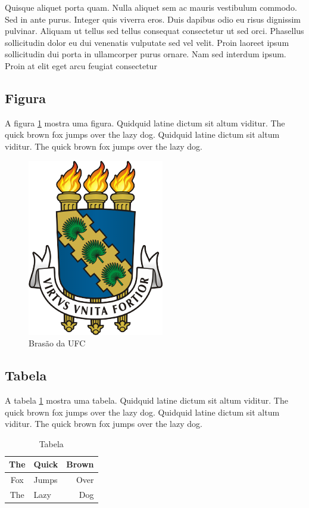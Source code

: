 Quisque aliquet porta quam. Nulla aliquet sem ac mauris vestibulum commodo. Sed in ante purus. Integer quis viverra eros. Duis dapibus odio eu risus dignissim pulvinar. Aliquam ut tellus sed tellus consequat consectetur ut sed orci. Phasellus sollicitudin dolor eu dui venenatis vulputate sed vel velit. Proin laoreet ipsum sollicitudin dui porta in ullamcorper purus ornare. Nam sed interdum ipsum. Proin at elit eget arcu feugiat consectetur 

\subsection{Figura}

A figura \ref{fig:graph} mostra uma figura. Quidquid latine dictum sit altum
viditur. The quick brown fox jumps over the lazy dog. Quidquid latine dictum
sit altum viditur. The quick brown fox jumps over the lazy dog.

\begin{figure}[htbp]
\centering
\includegraphics[width=.30\textwidth]{fig/UFC}
\caption{Brasão da UFC}
\label{fig:graph}
\end{figure}


\subsection{Tabela}

A tabela \ref{tab:tabela} mostra uma tabela. Quidquid latine dictum sit altum
viditur. The quick brown fox jumps over the lazy dog. Quidquid latine dictum
sit altum viditur. The quick brown fox jumps over the lazy dog.

\begin{table}[htbp]
	\caption{Tabela}
	\label{tab:tabela}
	\centering
	\begin{tabular}{|c|l|r|}
		\hline
		The 	&	Quick 	&	Brown	\\
		\hline
		Fox	&	Jumps	&	Over	\\
		The	&	Lazy	&	Dog	\\
		\hline 
	\end{tabular}
\end{table} 


